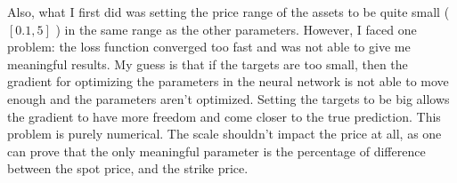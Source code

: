 Also, what I first did was setting the price range of the assets to be quite small ( $[0.1, 5]$ ) in the same range as the other parameters. However, I faced one problem: the loss function converged too fast and was not able to give me meaningful results.
My guess is that if the targets are too small, then the gradient for optimizing the parameters in the neural network is not able to move enough and the parameters aren't optimized. Setting the targets to be big allows the gradient to have more freedom and come closer to the true prediction. This problem is purely numerical. 
The scale shouldn't impact the price at all, as one can prove that the only meaningful parameter is the percentage of difference between the spot price, and the strike price.